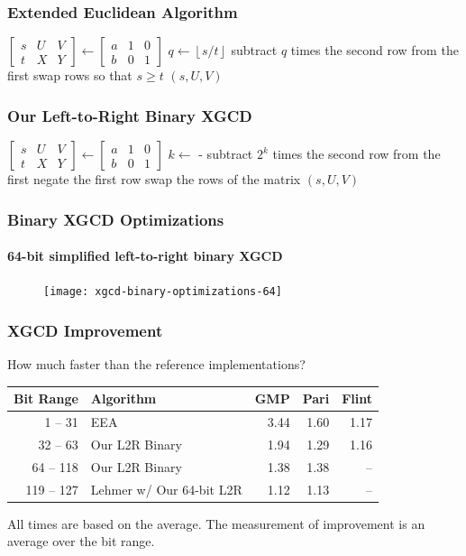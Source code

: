 \documentclass{beamer}
\newcommand{\ZZgez}{\mathbb{Z}_{\ge 0}}
\newcommand{\matrixThreeTwo}[6]{\left[ \begin{array}{rrr} #1 & #2 & #3 \\ #4 & #5 & #6 \end{array} \right]}
\newcommand{\floor}[1]{\left\lfloor #1 \right\rfloor}
\newcommand{\smallfont}{\fontsize{6pt}{7.2}\selectfont}
\begin{document}
\begin{frame}
\frametitle{Extended Euclidean Algorithm}
\begin{algorithmic}[1]
 \Comment{$a, b \in \ZZgez$}
\State $\matrixThreeTwo{s}{U}{V}{t}{X}{Y} \gets \matrixThreeTwo{a}{1}{0}{b}{0}{1}$
	\State $q \gets \floor{s/t}$
	\State subtract $q$ times the second row from the first
	\State swap rows so that $s \ge t$
\EndWhile
\State \Return $(s, U, V)$
\EndProcedure
\end{algorithmic}
\end{frame}


\begin{frame}
\frametitle{Our Left-to-Right Binary XGCD}
\begin{algorithmic}[1]
 \Comment{$a, b \in \ZZgez$}
\State $\matrixThreeTwo{s}{U}{V}{t}{X}{Y} \gets \matrixThreeTwo{a}{1}{0}{b}{0}{1}$
	\State $k \gets $  - 
	\State subtract $2^k$ times the second row from the first
	 negate the first row \EndIf
	 swap the rows of the matrix \EndIf
\EndWhile
\State \Return $(s, U, V)$
\EndProcedure
\end{algorithmic}
\end{frame}

\begin{frame}
\frametitle{Binary XGCD Optimizations}
\framesubtitle{64-bit simplified left-to-right binary XGCD}
\begin{figure}
\texttt{[image: xgcd-binary-optimizations-64]}
\end{figure}
\end{frame}


\begin{frame}
\frametitle{XGCD Improvement}

How much faster than the reference implementations?
\begin{table}
\centering
\begin{tabular}{ | r | l | r | r | r | }
\hline
Bit Range & Algorithm & GMP & Pari & Flint \\
\hline
1 -- 31 & EEA & 3.44 & 1.60 & 1.17 \\
32 -- 63 & Our L2R Binary & 1.94 & 1.29 & 1.16 \\
64 -- 118 & Our L2R Binary & 1.38 & 1.38 & -- \\
119 -- 127 & Lehmer w/ Our 64-bit L2R & 1.12 & 1.13 & -- \\
\hline
\end{tabular}
\end{table}

\bigskip
\smallfont
All times are based on the average.  The measurement of improvement is an average over the bit range.
\end{frame}
\end{document}
